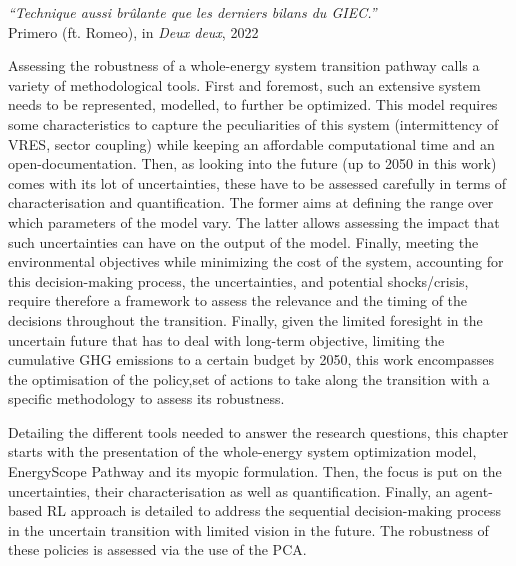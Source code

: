 \vspace{-0.2cm}
\begin{flushright}
\emph{``Technique aussi brûlante que les derniers bilans du GIEC.''}\\
 Primero (ft. Romeo), in \textit{Deux deux}, 2022
\end{flushright}
\vspace{0.4cm}
%
%
%

Assessing the robustness of a whole-energy system transition pathway calls a variety of methodological tools. First and foremost, such an extensive system needs to be represented, \ie modelled, to further be optimized. This model requires some characteristics to capture the peculiarities of this system (\eg intermittency of \gls{VRES}, sector coupling) while keeping an affordable computational time and an open-documentation.  Then, as looking into the future (\ie up to 2050 in this work) comes with its lot of uncertainties, these have to be assessed carefully in terms of characterisation and quantification. The former aims at defining the range over which parameters of the model vary. The latter allows assessing the impact that such uncertainties can have on the output of the model. Finally, meeting the environmental objectives while minimizing the cost of the system, accounting for this decision-making process, the uncertainties, and potential shocks/crisis, require therefore a framework to assess the relevance and the timing of the decisions throughout the transition. Finally, given the limited foresight in the uncertain future that has to deal with long-term objective, \ie limiting the cumulative \gls{GHG} emissions to a certain budget by 2050, this work encompasses the optimisation of the policy,\ie set of actions to take along the transition with a specific methodology to assess its robustness. 

Detailing the different tools needed to answer the research questions, this chapter starts with the presentation of the whole-energy system optimization model, EnergyScope Pathway and its myopic formulation. Then, the focus is put on the uncertainties, their characterisation as well as quantification. Finally, an agent-based \acrfull{RL} approach is detailed to address the sequential decision-making process in the uncertain transition with limited vision in the future. The robustness of these policies is assessed via the use of the \gls{PCA}.

